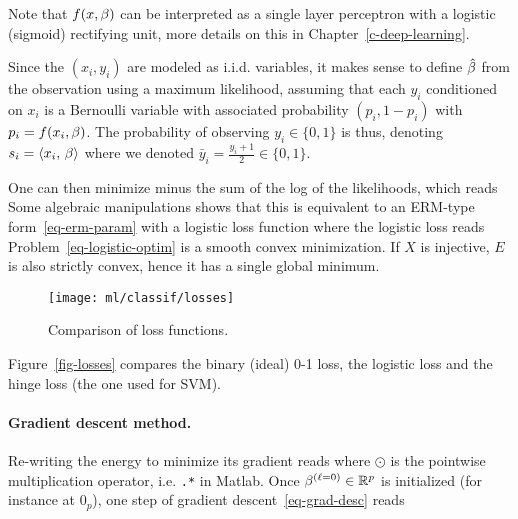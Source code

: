 Note that $f(x,\beta)$ can be interpreted as a single layer perceptron with a logistic (sigmoid) rectifying unit, more details on this in Chapter~\ref{c-deep-learning}. 

Since the $(x_i,y_i)$ are modeled as i.i.d. variables, it makes sense to define $\hat {\beta}$ from the observation using a maximum likelihood, assuming that each $y_i$ conditioned on $x_i$ is a Bernoulli variable with associated probability $(p_i,1-p_i)$ with $p_i=f(x_i,\beta)$. The probability of observing $y_i \in \{0,1\}$ is thus, denoting $s_i=\langle x_i,\,\beta\rangle$
where we denoted $\bar y_i = \frac{y_i+1}{2} \in \{0,1\}$.

One can then minimize minus the sum of the log of the likelihoods, which reads
Some algebraic manipulations shows that this is equivalent to an ERM-type form~\eqref{eq-erm-param} with a logistic loss function 
where the logistic loss reads
Problem~\eqref{eq-logistic-optim} is a smooth convex minimization. If $X$ is injective, $E$ is also strictly convex, hence it has a single global minimum.

\begin{figure}
\centering
\texttt{[image: ml/classif/losses]}
\caption{\label{fig-losses}
Comparison of loss functions.  
}
\end{figure}

Figure~\eqref{fig-losses} compares the binary (ideal) 0-1 loss, the logistic loss and the hinge loss (the one used for SVM).

\paragraph{Gradient descent method.}

Re-writing the energy to minimize
its gradient reads
where $\odot$ is the pointwise multiplication operator, i.e. \texttt{.*} in Matlab.
%
Once $\beta^{(\ell=0)} \in \mathbb{R}^{p}$ is initialized (for instance at $0_{p}$), one step of gradient descent~\eqref{eq-grad-desc} reads


